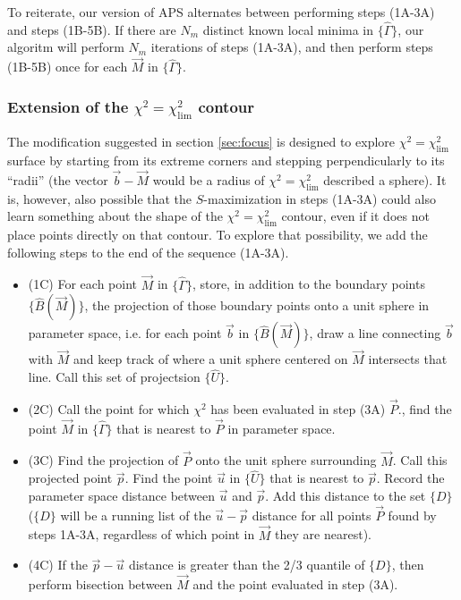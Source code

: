 \documentclass[useAMS,usenatbib]{aastex}
\begin{document}
To reiterate, our version of APS alternates between performing steps (1A-3A) and steps
(1B-5B).  If there are $N_m$ distinct known local minima in $\{\hat{\Gamma}\}$, 
our algoritm will perform
$N_m$ iterations of steps (1A-3A), and then perform steps (1B-5B) once for each
$\vec{M}$ in $\{\hat{\Gamma}\}$.

\subsubsection{Extension of the $\chi^2=\chi^2_\text{lim}$ contour}
\label{sec:unitSphere}

The modification suggested in section \ref{sec:focus} is designed to explore 
$\chi^2=\chi^2_\text{lim}$ surface by starting from its extreme corners and stepping
perpendicularly to its ``radii'' (the vector $\vec{b}-\vec{M}$ would be a radius of
$\chi^2=\chi^2_\text{lim}$ described a sphere).  It is, however, also possible
that the $S$-maximization in steps (1A-3A) could also learn something about the
shape of the $\chi^2=\chi^2_\text{lim}$ contour, even if it does not place
points directly on that contour.  To explore that possibility, we add the
following steps to the end of the sequence (1A-3A).

\begin{itemize}
\item(1C) For each point $\vec{M}$ in $\{\hat{\Gamma}\}$, store, 
in addition to the boundary
points $\{\hat{B}(\vec{M})\}$, the projection of those boundary points
onto a unit sphere in parameter space, i.e. for each point $\vec{b}$ in $\{\hat{B}(\vec{M})\}$, draw a line
connecting $\vec{b}$ with $\vec{M}$ and keep track of
where a unit sphere centered on $\vec{M}$ intersects that line.  Call this set
of projectsion $\{\hat{U}\}$.
\\
\item(2C) Call the point for which $\chi^2$ has been evaluated in step (3A)
$\vec{P}$., find the
point $\vec{M}$ in $\{\hat{\Gamma}\}$ that is nearest to $\vec{P}$ in parameter space.
\\
\item(3C) Find the
projection of $\vec{P}$ onto the unit sphere surrounding $\vec{M}$.  
Call this projected point $\vec{p}$.  Find the point $\vec{u}$ in
$\{\hat{U}\}$ that is nearest to $\vec{p}$.  Record the parameter space 
distance between $\vec{u}$ and $\vec{p}$.
Add this distance to the set $\{D\}$ ($\{D\}$ will be a running list
of the $\vec{u}-\vec{p}$ distance for all points $\vec{P}$ found by steps
1A-3A, regardless of which point in $\vec{M}$ they are nearest).
\\
\item(4C) If the $\vec{p}-\vec{u}$ distance is greater than the 2/3 quantile of $\{D\}$,
then perform bisection between $\vec{M}$ and the point evaluated in step (3A).
\end{itemize}
\end{document}

